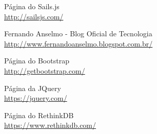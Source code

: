 \documentclass[a4paper,11pt]{article}
\begin{document}

\begin{thebibliography}{5}

  Página do Sails.js \\
  \url{http://sailsjs.com/}

  Fernando Anselmo - Blog Oficial de Tecnologia \\
  \url{http://www.fernandoanselmo.blogspot.com.br/}

  Página do Bootstrap \\
  \url{http://getbootstrap.com/}

  Página da JQuery \\
  \url{https://jquery.com/}

  Página do RethinkDB \\
  \url{https://www.rethinkdb.com/}

\end{thebibliography}
  
\end{document}
